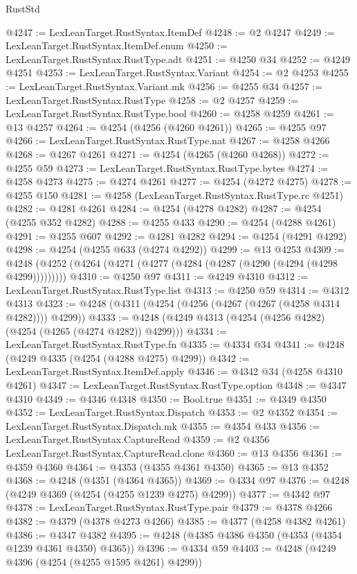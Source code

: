 \begin{lexlean}{RustStd}
\begin{coremodule}
@4247 := LexLeanTarget.RustSyntax.ItemDef
@4248 := @2 @4247
@4249 := LexLeanTarget.RustSyntax.ItemDef.enum
@4250 := LexLeanTarget.RustSyntax.RustType.adt
@4251 := @4250 @34
@4252 := @4249 @4251
@4253 := LexLeanTarget.RustSyntax.Variant
@4254 := @2 @4253
@4255 := LexLeanTarget.RustSyntax.Variant.mk
@4256 := @4255 @34
@4257 := LexLeanTarget.RustSyntax.RustType
@4258 := @2 @4257
@4259 := LexLeanTarget.RustSyntax.RustType.bool
@4260 := @4258 @4259
@4261 := @13 @4257
@4264 := @4254 (@4256 (@4260 @4261))
@4265 := @4255 @97
@4266 := LexLeanTarget.RustSyntax.RustType.nat
@4267 := @4258 @4266
@4268 := @4267 @4261
@4271 := @4254 (@4265 (@4260 @4268))
@4272 := @4255 @59
@4273 := LexLeanTarget.RustSyntax.RustType.bytes
@4274 := @4258 @4273
@4275 := @4274 @4261
@4277 := @4254 (@4272 @4275)
@4278 := @4255 @150
@4281 := @4258 (LexLeanTarget.RustSyntax.RustType.rc @4251)
@4282 := @4281 @4261
@4284 := @4254 (@4278 @4282)
@4287 := @4254 (@4255 @352 @4282)
@4288 := @4255 @433
@4290 := @4254 (@4288 @4261)
@4291 := @4255 @607
@4292 := @4281 @4282
@4294 := @4254 (@4291 @4292)
@4298 := @4254 (@4255 @633 (@4274 @4292))
@4299 := @13 @4253
@4309 := @4248 (@4252 (@4264 (@4271 (@4277 (@4284 (@4287 (@4290 (@4294 (@4298 @4299)))))))))
@4310 := @4250 @97
@4311 := @4249 @4310
@4312 := LexLeanTarget.RustSyntax.RustType.list
@4313 := @4250 @59
@4314 := @4312 @4313
@4323 := @4248 (@4311 (@4254 (@4256 (@4267 (@4267 (@4258 @4314 @4282)))) @4299))
@4333 := @4248 (@4249 @4313 (@4254 (@4256 @4282) (@4254 (@4265 (@4274 @4282)) @4299)))
@4334 := LexLeanTarget.RustSyntax.RustType.fn
@4335 := @4334 @34
@4341 := @4248 (@4249 @4335 (@4254 (@4288 @4275) @4299))
@4342 := LexLeanTarget.RustSyntax.ItemDef.apply
@4346 := @4342 @34 (@4258 @4310 @4261)
@4347 := LexLeanTarget.RustSyntax.RustType.option
@4348 := @4347 @4310
@4349 := @4346 @4348
@4350 := Bool.true
@4351 := @4349 @4350
@4352 := LexLeanTarget.RustSyntax.Dispatch
@4353 := @2 @4352
@4354 := LexLeanTarget.RustSyntax.Dispatch.mk
@4355 := @4354 @433
@4356 := LexLeanTarget.RustSyntax.CaptureRead
@4359 := @2 @4356 LexLeanTarget.RustSyntax.CaptureRead.clone
@4360 := @13 @4356
@4361 := @4359 @4360
@4364 := @4353 (@4355 @4361 @4350)
@4365 := @13 @4352
@4368 := @4248 (@4351 (@4364 @4365))
@4369 := @4334 @97
@4376 := @4248 (@4249 @4369 (@4254 (@4255 @1239 @4275) @4299))
@4377 := @4342 @97
@4378 := LexLeanTarget.RustSyntax.RustType.pair
@4379 := @4378 @4266
@4382 := @4379 (@4378 @4273 @4266)
@4385 := @4377 (@4258 @4382 @4261)
@4386 := @4347 @4382
@4395 := @4248 (@4385 @4386 @4350 (@4353 (@4354 @1239 @4361 @4350) @4365))
@4396 := @4334 @59
@4403 := @4248 (@4249 @4396 (@4254 (@4255 @1595 @4261) @4299))

\end{coremodule}
\end{lexlean}
